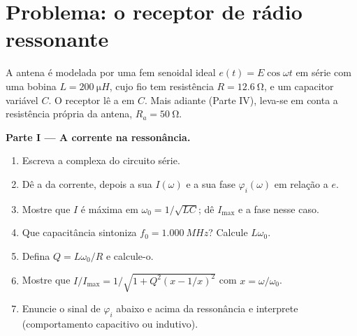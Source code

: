 \section{Problema: o receptor de rádio ressonante}

\begin{problem}
\label{pb:b1:sinusoidal-impedance:1}
A antena é modelada por uma fem senoidal ideal $e(t) = E\cos\omega t$
em série com uma bobina $L = \qty{200}{\micro H}$, cujo fio tem
resistência $R = \qty{12.6}{\ohm}$, e um capacitor variável $C$. O
receptor lê a  em $C$. Mais adiante (Parte IV), leva-se em conta a
resistência própria da antena, $R_a = \qty{50}{\ohm}$.

\medskip
\noindent\textbf{Parte I --- A corrente na ressonância.}
\begin{enumerate}
  \item Escreva a  complexa do circuito série.
  \item Dê a  da corrente, depois a sua 
        $I(\omega)$ e a sua fase $\varphi_i(\omega)$ em relação a $e$.
  \item Mostre que $I$ é máxima em $\omega_0 = 1/\sqrt{LC}$; dê
        $I_{\max}$ e a fase nesse caso.
  \item Que capacitância sintoniza $f_0 = \qty{1.000}{MHz}$? Calcule
        $L\omega_0$.
  \item Defina $Q = L\omega_0/R$ e calcule-o.
  \item Mostre que $I/I_{\max} = 1/\sqrt{1 + Q^2(x - 1/x)^2}$ com
        $x = \omega/\omega_0$.
  \item Enuncie o sinal de $\varphi_i$ abaixo e acima da ressonância e
        interprete (comportamento capacitivo ou indutivo).
\end{enumerate}


\end{problem}
